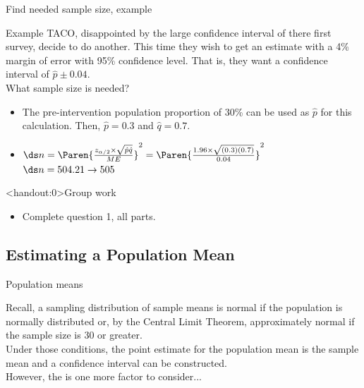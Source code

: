 \documentclass[xcolor=table, handout]{beamer}
\begin{document}
\begin{frame}{Find needed sample size, example}
\begin{exampleblock}{Example}
\large
TACO, disappointed by the large confidence interval of there first survey, decide to do another. This time they wish to get an estimate with a 4\% margin of error with 95\% confidence level. That is, they want a confidence interval of $\hat p \pm 0.04$.\\
\medskip
What sample size is needed?
\begin{itemize}
\pause\item The pre-intervention population proportion of 30\% can be used as $\hat p$ for this calculation. Then, $\hat p = 0.3$ and $\hat q = 0.7$.
\pause\item $\ds n = \Paren{\frac {z_{\alpha/2} \times \sqrt{\hat p \hat q}}{ME}}^2 = \Paren{\frac {1.96 \times \sqrt{(0.3) (0.7)}}{0.04}}^2$\\
\medskip
$\ds n = 504.21 \to 505$ 
\end{itemize}
\end{exampleblock}
\end{frame}

\begin{frame}<handout:0>{Group work}
\begin{block}{}
\large
\begin{itemize}
\item Complete question 1, all parts.
\end{itemize}
\end{block}
\end{frame}


\subsection{Estimating a Population Mean}

\begin{frame}{Population means}

\begin{block}{}
\large
Recall, a sampling distribution of sample means is normal if the population is normally distributed or, by the Central Limit Theorem, approximately normal if the sample size is 30 or greater.\\
\pause\medskip
Under those conditions, the point estimate for the population mean is the sample mean and a confidence interval can be constructed.\\
\pause\medskip
However, the is one more factor to consider...
\end{block}
\end{frame}
\end{document}
